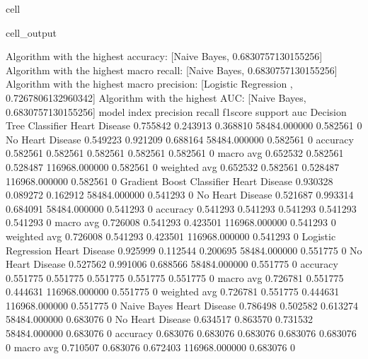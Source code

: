 \documentclass[letterpaper,10pt,english]{jupyterBook}
\begin{document}
\begin{sphinxuseclass}{cell}
\begin{sphinxVerbatimOutput}
\begin{sphinxuseclass}{cell_output}
\begin{sphinxVerbatim}[commandchars=\\\{\}]
Algorithm with the highest accuracy: [\PYGZsq{}Naive Bayes\PYGZsq{}, 0.6830757130155256]
Algorithm with the highest macro recall:
        [\PYGZsq{}Naive Bayes\PYGZsq{}, 0.6830757130155256]
Algorithm with the highest macro precision:
        [\PYGZsq{}Logistic Regression \PYGZsq{}, 0.7267806132960342]
Algorithm with the highest AUC:
        [\PYGZsq{}Naive Bayes\PYGZsq{}, 0.6830757130155256]
model                      index             precision  recall    f1\PYGZhy{}score  support        auc     
Decision Tree Classifier   Heart Disease     0.755842   0.243913  0.368810  58484.000000   0.582561    0
                           No Heart Disease  0.549223   0.921209  0.688164  58484.000000   0.582561    0
                           accuracy          0.582561   0.582561  0.582561  0.582561       0.582561    0
                           macro avg         0.652532   0.582561  0.528487  116968.000000  0.582561    0
                           weighted avg      0.652532   0.582561  0.528487  116968.000000  0.582561    0
Gradient Boost Classifier  Heart Disease     0.930328   0.089272  0.162912  58484.000000   0.541293    0
                           No Heart Disease  0.521687   0.993314  0.684091  58484.000000   0.541293    0
                           accuracy          0.541293   0.541293  0.541293  0.541293       0.541293    0
                           macro avg         0.726008   0.541293  0.423501  116968.000000  0.541293    0
                           weighted avg      0.726008   0.541293  0.423501  116968.000000  0.541293    0
Logistic Regression        Heart Disease     0.925999   0.112544  0.200695  58484.000000   0.551775    0
                           No Heart Disease  0.527562   0.991006  0.688566  58484.000000   0.551775    0
                           accuracy          0.551775   0.551775  0.551775  0.551775       0.551775    0
                           macro avg         0.726781   0.551775  0.444631  116968.000000  0.551775    0
                           weighted avg      0.726781   0.551775  0.444631  116968.000000  0.551775    0
Naive Bayes                Heart Disease     0.786498   0.502582  0.613274  58484.000000   0.683076    0
                           No Heart Disease  0.634517   0.863570  0.731532  58484.000000   0.683076    0
                           accuracy          0.683076   0.683076  0.683076  0.683076       0.683076    0
                           macro avg         0.710507   0.683076  0.672403  116968.000000  0.683076    0

\end{sphinxVerbatim}
\end{sphinxuseclass}
\end{sphinxVerbatimOutput}
\end{sphinxuseclass}
\end{document}
